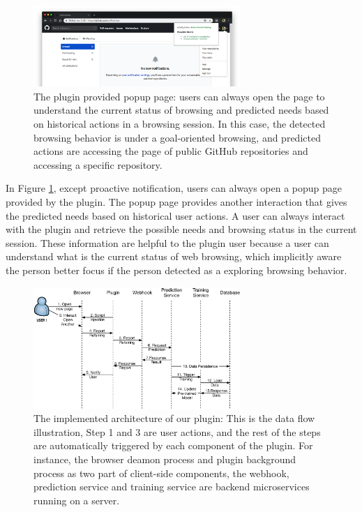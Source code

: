 \begin{figure}[H]
    \centering
    \includegraphics[width=0.7\textwidth]{figures/plugin-predicting-result}
    \caption{The plugin provided popup page: users can always open the page
    to understand the current status of browsing and predicted needs based on
    historical actions in a browsing session. In this case, the detected browsing behavior
    is under a goal-oriented browsing, and predicted actions
    are accessing the page of public GitHub repositories and accessing a specific repository.}
    \label{fig:plugin-predict}
\end{figure}

In Figure \ref{fig:plugin-predict}, except proactive notification, 
users can always open a popup page provided by the plugin.
The popup page provides another interaction that gives the predicted needs 
based on historical user actions. A user can always interact with the plugin and
retrieve the possible needs and browsing status in the current session.
These information are helpful to the plugin user because a user can understand
what is the current status of web browsing, which implicitly aware the person better focus
if the person detected as a exploring browsing behavior.

\begin{figure}[H]
    \centering
    \includegraphics[width=0.7\textwidth]{figures/arch}
    \caption{The implemented architecture of our plugin: This is the data flow illustration,
    Step 1 and 3 are user actions, and the rest of the steps are automatically triggered by
    each component of the plugin. For instance, the browser deamon process
    and plugin background process as two part of client-side components, the webhook,
    prediction service and training service are backend microservices running on a server.}
    \label{fig:arch}
\end{figure}

